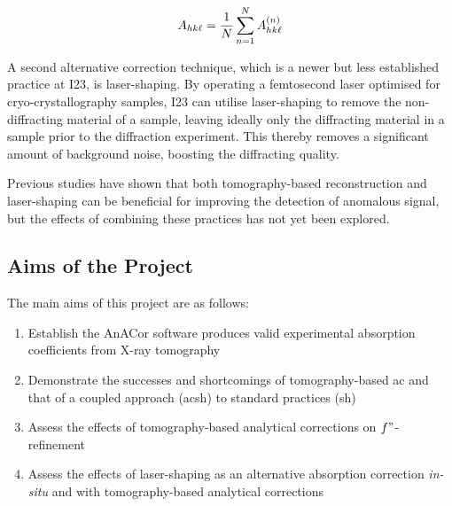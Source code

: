 \begin{equation}
    A_{hk\ell} = \frac{1}{N} \sum_{n=1}^N A_{hk\ell}^{(n)}
\end{equation}

A second alternative correction technique, which is a newer but less established practice at I23, is laser-shaping. By operating a femtosecond laser optimised for cryo-crystallography samples, I23 can utilise laser-shaping to remove the non-diffracting material of a sample, leaving ideally only the diffracting material in a sample prior to the diffraction experiment. This thereby removes a significant amount of background noise, boosting the diffracting quality.

Previous studies have shown that both tomography-based reconstruction and laser-shaping can be beneficial for improving the detection of anomalous signal, but the effects of combining these practices has not yet been explored.

\subsection{Aims of the Project} %

The main aims of this project are as follows:

\begin{enumerate}
    \item Establish the AnACor software produces valid experimental absorption coefficients from X-ray tomography
    \item Demonstrate the successes and shortcomings of tomography-based \ac{ac} and that of a coupled approach (\ac{acsh}) to standard practices (\ac{sh})
    \item Assess the effects of tomography-based analytical corrections on $f"$-refinement
    \item Assess the effects of laser-shaping as an alternative absorption correction \textit{in-situ} and with tomography-based analytical corrections
\end{enumerate}